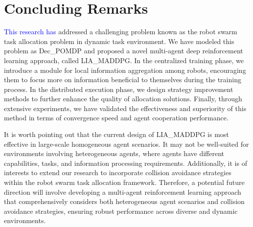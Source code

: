 \documentclass[lettersize,journal]{IEEEtran}
\newcommand{\blue}[1]{\textcolor{blue}{#1}}
\begin{document}
\section{Concluding Remarks}\label{section5}
\blue{This research has} addressed a challenging problem known as the robot swarm task allocation problem in dynamic task environment. We have modeled this problem as  Dec\_POMDP  and proposed a  novel multi-agent deep reinforcement learning  approach, called LIA\_MADDPG. In the centralized training phase, we introduce a module for local information aggregation among robots, encouraging them to focus more on information beneficial to themselves during the training process. In the distributed execution phase, we design strategy improvement methods to further enhance the quality of allocation solutions.  Finally, through extensive experiments, we have validated the effectiveness and superiority of this method in terms of convergence speed and agent cooperation performance.

It is worth pointing out that the current design of LIA\_MADDPG is most effective in large-scale homogeneous agent scenarios. It may not be well-suited for environments involving heterogeneous agents, where agents have different capabilities, tasks, and information processing requirements. Additionally, it is of interests to extend our research to incorporate collision avoidance strategies within the robot swarm task allocation framework. Therefore, a potential future direction will involve developing a multi-agent reinforcement learning approach that comprehensively considers both heterogeneous agent scenarios and collision avoidance strategies, ensuring robust performance across diverse and dynamic environments.


\end{document}
